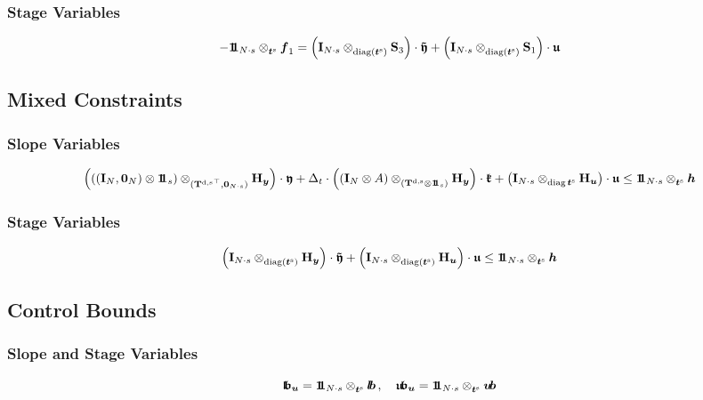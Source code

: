 \documentclass{article}
\newcommand{\tp}{\top}%
\newcommand{\kron}{\otimes}%
\newcommand{\dkron}[2][]{\mathbin{\kron_{#2}^{#1}}}%
\newcommand{\diag}{\mathop{\mathrm{diag}}}%
\newcommand{\vectorfont}[1]{\boldsymbol{#1}}%
\newcommand{\greekvectorfont}[1]{\boldsymbol{#1}}%
\newcommand{\matrixfont}[1]{\mathbf{#1}}%
\newcommand{\fvec}{\vectorfont{f}}
\newcommand{\hvec}{\vectorfont{h}}
\newcommand{\tvec}{\vectorfont{t}}
\newcommand{\uvec}{\vectorfont{u}}
\newcommand{\yvec}{\vectorfont{y}}
\newcommand{\kfrakvec}{\vectorfont{\mathfrak{k}}}
\newcommand{\ufrakvec}{\vectorfont{\mathfrak{u}}}
\newcommand{\yfrakvec}{\vectorfont{\mathfrak{y}}}
\newcommand{\tildeyfrakvec}{\vectorfont{\tilde{\mathfrak{y}}}}
\newcommand{\nullvec}{\greekvectorfont{0}}
\newcommand{\lbvec}{\vectorfont{l\negthinspace b}}
\newcommand{\ubvec}{\vectorfont{u\negthinspace b}}
\newcommand{\lbfrakvec}{\vectorfont{\mathfrak{l\negthinspace b}}}
\newcommand{\ubfrakvec}{\vectorfont{\mathfrak{u\negthinspace b}}}
\newcommand{\einsvec}{\vectorfont{1}\negthinspace\negthinspace\vectorfont{1}} %
\newcommand{\Hmat}{\matrixfont{H}}
\newcommand{\Imat}{\matrixfont{I}}%
\newcommand{\Smat}{\matrixfont{S}}
\newcommand{\Tmat}{\matrixfont{T}}
\begin{document}
\subsubsection*{Stage Variables}
\[
-\einsvec_{N \cdot s} \dkron{\tvec^{\mathrm{s}}} \fvec_1 =
\left(\Imat_{N \cdot s} \dkron{\diag (\tvec^{\mathrm{s}})} \Smat_3 \right) \cdot \tildeyfrakvec
+ \left(\Imat_{N \cdot s} \dkron{\diag (\tvec^{\mathrm{s}})} \Smat_1 \right) \cdot \ufrakvec
\]



\subsection*{Mixed Constraints}
\subsubsection*{Slope Variables}
\[
\left( \left( (\Imat_{N}, \nullvec_N) \kron \einsvec_s\right) \dkron{({\Tmat^{\mathrm{d},\mathrm{s}}}^{\tp},\nullvec_{N \cdot s})} \Hmat_{\yvec} \right) \cdot \yfrakvec
+ \Delta_t \cdot \left(  (\Imat_{N} \kron A) \dkron{(\Tmat^{\mathrm{d},\mathrm{s}} \kron \einsvec_s)} \Hmat_{\yvec} \right)\cdot \kfrakvec
+ \left(\Imat_{N \cdot s} \dkron{\diag \tvec^{\mathrm{s}}} \Hmat_{\uvec}  \right) \cdot \ufrakvec
\leq \einsvec_{N\cdot s} \dkron{\tvec^{\mathrm{s}}} \hvec
\]
\subsubsection*{Stage Variables}
\[
\left(\Imat_{N \cdot s} \dkron{\diag (\tvec^{\mathrm{s}})} \Hmat_{\yvec} \right) \cdot \tildeyfrakvec
+ \left(\Imat_{N \cdot s} \dkron{\diag (\tvec^{\mathrm{s}})} \Hmat_{\uvec} \right) \cdot \ufrakvec
\leq \einsvec_{N \cdot s} \dkron{\tvec^{\mathrm{s}}} \hvec 
\]


\subsection*{Control Bounds}
\subsubsection*{Slope and Stage Variables}
\[
\lbfrakvec_{\uvec} = \einsvec_{N\cdot s} \dkron{\tvec^{\mathrm{s}}} \lbvec \,,\quad
\ubfrakvec_{\uvec} = \einsvec_{N\cdot s} \dkron{\tvec^{\mathrm{s}}} \ubvec
\]
\end{document}
